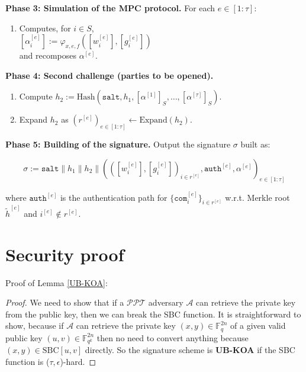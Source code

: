 \documentclass[english]{article}
\begin{document}
\begin{tcolorbox}[title=Protocol 15: Signing Algorithm, breakable, enhanced, colback=white, colframe=black]
			\vspace{0.5em}
			\textbf{Phase 3: Simulation of the MPC protocol.} For each $e \in [1:\tau]$:
			\begin{enumerate}[label=\arabic*.]
				\item Computes, for $i \in S$, \\
				\quad $[\alpha^{[e]}_i] := \varphi_{x,e,f}([w^{[e]}_i], [g^{[e]}_i])$ \\
				and recomposes $\alpha^{[e]}$. \\
			\end{enumerate}
			
			\vspace{0.5em}
			\textbf{Phase 4: Second challenge (parties to be opened).}
			\begin{enumerate}[label=\arabic*.]
				\item Compute $h_2 := \text{Hash}(\texttt{salt}, h_1, [\alpha^{[1]}]_{S}, \dots, [\alpha^{[\tau]}]_{S})$.
				\item Expand $h_2$ as $(r^{[e]})_{e \in [1:\tau]} \leftarrow \text{Expand}(h_2)$.
			\end{enumerate}
			
			\vspace{0.5em}
			\textbf{Phase 5: Building of the signature.} Output the signature $\sigma$ built as:
			
			\[
			\sigma := \texttt{salt} \parallel h_1 \parallel h_2 \parallel (([w^{[e]}_i], [g^{[e]}_i])_{i \in r^{[e]}}, \texttt{auth}^{[e]}, \alpha^{[e]})_{e \in [1:\tau]}
			\]
			
			where $\texttt{auth}^{[e]}$ is the authentication path for $\{\texttt{com}^{[e]}_i\}_{i \in r^{[e]}}$ w.r.t. Merkle root $\tilde{h}^{[e]}$ and $i^{[e]} \notin r^{[e]}$.
		\end{tcolorbox}
	

\section{Security proof}\label{appendix:proof}
	Proof of Lemma \ref{UB-KOA}:
	\begin{proof}
		We need to show that if a $\mathcal{PPT}$ adversary $\mathcal{A}$ can retrieve the private key from the public key, then we can break the SBC function.
		It is straightforward to show, because if $\mathcal{A}$ can retrieve the private key $(x, y) \in \mathbb{F}_{q}^{2n}$ of a given valid public key $(u, v) \in \mathbb{F}_{q^k}^{2n}$ then no need to convert anything because $(x, y) \in \text{SBC}[u, v]$ directly. So the signature scheme is \textbf{UB-KOA} if the SBC function is ($\tau, \epsilon$)-hard.
	\end{proof}
	
\end{document}
